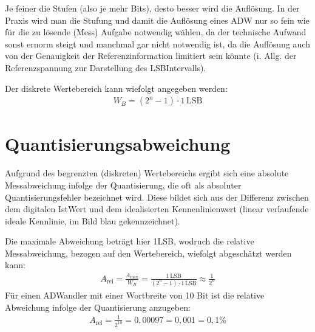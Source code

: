 \documentclass[letterpaper,10pt,english]{jupyterBook}
\begin{document}
\sphinxAtStartPar
Je feiner die Stufen (also je mehr Bits), desto besser wird die Auflösung.
In der Praxis wird man die Stufung und damit die Auflösung eines ADW nur so fein wie für die zu lösende (Mess\sphinxhyphen{}) Aufgabe notwendig wählen, da der technische Aufwand sonst ernorm steigt und manchmal gar nicht notwendig ist, da die Auflösung auch von der Genauigkeit der Referenzinformation limitiert sein könnte (i. Allg. der Referenzspannung zur Darstellung des LSB\sphinxhyphen{}Intervalls).

\sphinxAtStartPar
Der diskrete Wertebereich kann wiefolgt angegeben werden:
\begin{equation*}
\begin{split}W_B = (2^n-1) \cdot 1\,\mathrm{LSB}\end{split}
\end{equation*}

\section{Quantisierungsabweichung}
\label{\detokenize{content/2_Digital:quantisierungsabweichung}}
\sphinxAtStartPar
Aufgrund des begrenzten (diskreten) Wertebereichs ergibt sich eine absolute Messabweichung infolge der Quantisierung, die oft als absoluter Quantisierungsfehler bezeichnet wird. Diese bildet sich aus der Differenz zwischen dem digitalen Ist\sphinxhyphen{}Wert und dem idealisierten Kennenlinienwert (linear verlaufende ideale Kennlinie, im Bild blau gekennzeichnet).

\sphinxAtStartPar
Die maximale Abweichung beträgt hier 1LSB, wodruch die relative Messabweichung, bezogen auf den Wertebereich, wiefolgt abgeschätzt werden kann:
\begin{equation*}
\begin{split}A_\mathrm{rel} = \frac{A_\mathrm{max}}{W_B} = \frac{1\,\mathrm{LSB}}{(2^n-1)\cdot 1\,\mathrm{LSB}} \approx \frac{1}{2^n}\end{split}
\end{equation*}
\sphinxAtStartPar
{} Für einen A\sphinxhyphen{}D\sphinxhyphen{}Wandler mit einer Wortbreite von 10 Bit ist die relative Abweichung infolge der Quantisierung anzugeben:
\begin{equation*}
\begin{split}A_\mathrm{rel} = \frac{1}{2^{10}} = 0,00097 = 0,001 = 0,1\% \end{split}
\end{equation*}
\end{document}
